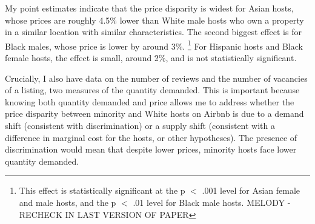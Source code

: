 
My point estimates indicate that the price disparity is widest for Asian hosts, whose prices are roughly 4.5\% lower than White male hosts who own a property in a similar location with similar characteristics. The second biggest effect is for Black males, whose price is lower by around 3\%.%
	\footnote{This effect is statistically significant at the p $<$ .001 level for Asian female and male hosts, and the p $<$ .01 level for Black male hosts. MELODY - RECHECK IN LAST VERSION OF PAPER} 
For Hispanic hosts and Black female hosts, the effect is small, around 2\%, and is not statistically significant. 


Crucially, I also have data on the number of reviews and the number of vacancies of a listing, two measures of the quantity demanded. This is important because knowing both quantity demanded and price allows me to address whether the price disparity between minority and White hosts on Airbnb is due to a demand shift (consistent with discrimination) or a supply shift (consistent with a difference in marginal cost for the hosts, or other hypotheses). The presence of discrimination would mean that despite lower prices, minority hosts face lower quantity demanded. 

